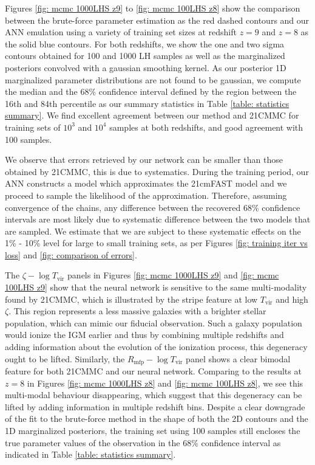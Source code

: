 \documentclass[useAMS,usenatbib]{mnras}
\begin{document}
Figures \ref{fig: mcmc 1000LHS z9} to \ref{fig: mcmc 100LHS z8} show the comparison between the brute-force parameter estimation as the red dashed contours and our ANN emulation using a variety of training set sizes at redshift $z = 9$ and $z = 8$ as the solid blue contours.
For both redshifts, we show the one and two sigma contours obtained for 100 and 1000 LH samples as well as the marginalized posteriors convolved with a gaussian smoothing kernel.
As our posterior 1D marginalized parameter distributions are not found to be gaussian, we compute the median and the 68\% confidence interval defined by the region between the 16th and 84th percentile as our summary statistics in Table \ref{table: statistics summary}. 
We find excellent agreement between our method and 21CMMC for training sets of $10^3$ and $10^4$ samples at both redshifts, and good agreement with 100 samples.

We observe that errors retrieved by our network can be smaller than those obtained by 21CMMC, this is due to systematics.
During the training period, our ANN constructs a model which approximates the 21cmFAST model and we proceed to sample the likelihood of the approximation.
Therefore, assuming convergence of the chains, any difference between the recovered 68\% confidence intervals are most likely due to systematic difference between the two models that are sampled.
We estimate that we are subject to these systematic effects on the 1\% - 10\% level for large to small training sets, as per Figures \ref{fig: training iter vs loss} and \ref{fig: comparison of errors}.

The $\zeta - \log T_\text{vir}$ panels in Figures \ref{fig: mcmc 1000LHS z9} and \ref{fig: mcmc 100LHS z9} show that the neural network is sensitive to the same multi-modality found by 21CMMC, which is illustrated by the stripe feature at low $T_\text{vir}$ and high $\zeta$.
This region represents a less massive galaxies with a brighter stellar population, which can mimic our fiducial observation. 
Such a galaxy population would ionize the IGM earlier and thus by combining  multiple redshifts and adding information about the evolution of the ionization process, this degeneracy ought to be lifted.
Similarly, the $R_\text{mfp} - \log T_\text{vir}$ panel shows a clear bimodal feature for both 21CMMC and our neural network.
Comparing to the results at $z = 8$ in Figures \ref{fig: mcmc 1000LHS z8} and \ref{fig: mcmc 100LHS z8}, we see this multi-modal behaviour disappearing, which suggest that this degeneracy can be lifted by adding information in multiple redshift bins.
Despite a clear downgrade of the fit to the brute-force method in the shape of both the 2D contours and the 1D marginalized posteriors, the training set using 100 samples still encloses the true parameter values of the observation in the 68\% confidence interval as indicated in Table \ref{table: statistics summary}.  
\end{document}
